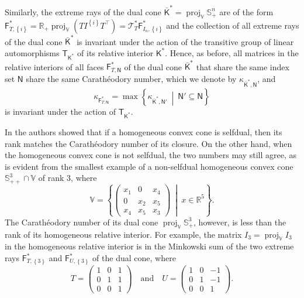 \documentclass[oneside]{amsart}
\theoremstyle{plain}
\theoremstyle{definition}
\theoremstyle{remark}
\numberwithin{equation}{section}
\DeclareMathOperator{\proj}{proj}
\begin{document}
Similarly, the extreme rays of the dual cone $\bar{\mathsf{K}}^{*} =
\proj_{\mathbb{V}} \mathbb{S}^{n}_{+}$ are of the form
$\mathsf{F}^{*}_{T,\left\{i\right\}} = \mathbb{R}_+
\proj_{\mathbb{V}}\left( T I^{\left\{i\right\}} T^{\top} \right) =
\mathcal{T}^{*}_{T} \mathsf{F}^{*}_{I_{n},\left\{i\right\}}$ and the
collection of all extreme rays of the dual cone $\bar{\mathsf{K}}^{*}$ is
invariant under the action of the transitive group of linear automorphisms
$\mathsf{T}_{\mathsf{K}^{*}}$ of its relative interior $\mathsf{K}^{*}$.
Hence, as before, all matrices in the relative interiors of all faces
$\mathsf{F}^{*}_{T,\mathsf{N}}$ of the dual cone $\bar{\mathsf{K}}^{*}$
that share the same index set $\mathsf{N}$ share the same Carath\'eodory
number, which we denote by $\kappa_{\bar{\mathsf{K}}^{*},\mathsf{N}}$, and
\[
\kappa_{\mathsf{F}^{*}_{T,\mathsf{N}}} = \max
\left\{\kappa_{\bar{\mathsf{K}}^{*},\mathsf{N}'}\ \middle|\ \mathsf{N}'
\subseteq \mathsf{N}\right\}
\]
is invariant under the action of $\mathsf{T}_{\mathsf{K}^{*}}$.

In \cite[Lemma~4.1]{GulTun98} the authors showed that if a homogeneous
convex cone is selfdual, then its rank matches the Carath\'eodory number of
its closure. On the other hand, when the homogeneous convex cone is not
selfdual, the two numbers may still agree, as is evident from the smallest
example of a non-selfdual homogeneous convex cone $\mathbb{S}^{3}_{++} \cap
\mathbb{V}$ of rank $3$, where
\[
\mathbb{V} = \left\{
\begin{pmatrix}
x_{1} & 0 & x_{4}
\\
0 & x_{2} & x_{5}
\\
x_{4} & x_{5} & x_{3}
\end{pmatrix}
\ \middle|\ x \in \mathbb{R}^5\right\}.
\]
The Carath\'eodory number of its dual cone $\proj_{\mathbb{V}}
\mathbb{S}^{3}_{+}$, however, is less than the rank of its homogeneous
relative interior. For example, the matrix $I_{3} = \proj_{\mathbb{V}}
I_{3}$ in the homogeneous relative interior is in the Minkowski sum of the
two extreme rays $\mathsf{F}^{*}_{T,\left\{3\right\}}$ and
$\mathsf{F}^{*}_{U,\left\{3\right\}}$ of the dual cone, where
\[
T =
\begin{pmatrix}
1 & 0 & 1
\\
0 & 1 & 1
\\
0 & 0 & 1
\end{pmatrix}
\quad \text{and} \quad U =
\begin{pmatrix}
1 & 0 & -1
\\
0 & 1 & -1
\\
0 & 0 & 1
\end{pmatrix}.
\]
\end{document}
